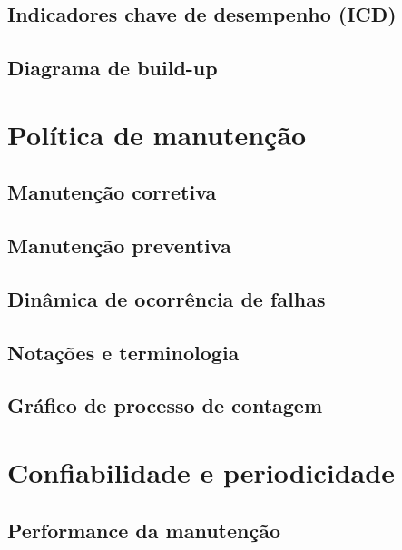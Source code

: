 \documentclass[
  letterpaper,
]{book}
\begin{document}
\subsection{Indicadores chave de desempenho
(ICD)}\label{indicadores-chave-de-desempenho-icd}

\subsection{Diagrama de build-up}\label{diagrama-de-build-up}

\section{Política de manutenção}\label{poluxedtica-de-manutenuxe7uxe3o}

\subsection{Manutenção corretiva}\label{manutenuxe7uxe3o-corretiva}

\subsection{Manutenção preventiva}\label{manutenuxe7uxe3o-preventiva}

\subsection{Dinâmica de ocorrência de
falhas}\label{dinuxe2mica-de-ocorruxeancia-de-falhas}

\subsection{Notações e
terminologia}\label{notauxe7uxf5es-e-terminologia}

\subsection{Gráfico de processo de
contagem}\label{gruxe1fico-de-processo-de-contagem}

\section{Confiabilidade e
periodicidade}\label{confiabilidade-e-periodicidade}

\subsection{Performance da
manutenção}\label{performance-da-manutenuxe7uxe3o}
\end{document}

